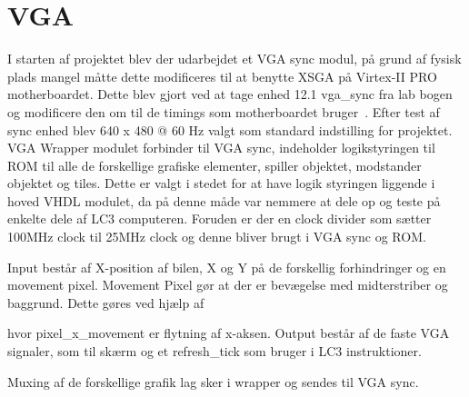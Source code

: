 \section{VGA}
I starten af projektet blev der udarbejdet et VGA sync modul, på grund af fysisk plads mangel måtte dette modificeres til at benytte XSGA på Virtex-II PRO motherboardet. Dette blev gjort ved at tage enhed 12.1 vga\_sync fra lab bogen~\cite{chu} og modificere den om til de timings som motherboardet bruger~\cite{hardwaremanual tabel 2-6 side 37}.
Efter test af sync enhed blev 640 x 480 @ 60 Hz valgt som standard indstilling for projektet.
VGA Wrapper modulet forbinder til VGA sync, indeholder logikstyringen til ROM til alle de forskellige grafiske elementer, spiller objektet, modstander objektet og tiles. Dette er valgt i stedet for at have logik styringen liggende i hoved VHDL modulet, da på denne måde var nemmere at dele op og teste på enkelte dele af LC3 computeren. Foruden er der en clock divider som sætter 100MHz clock til 25MHz clock og denne bliver brugt i VGA sync og ROM. 

Input består af X-position af bilen, X og Y på de forskellig forhindringer og en movement pixel. Movement Pixel gør at der er bevægelse med midterstriber og baggrund.
Dette gøres ved hjælp af 

hvor pixel\_x\_movement er flytning af x-aksen.
Output består af de faste VGA signaler, som til skærm og et refresh\_tick som bruger i LC3 instruktioner. 

Muxing af de forskellige grafik lag sker i wrapper og sendes til VGA sync.